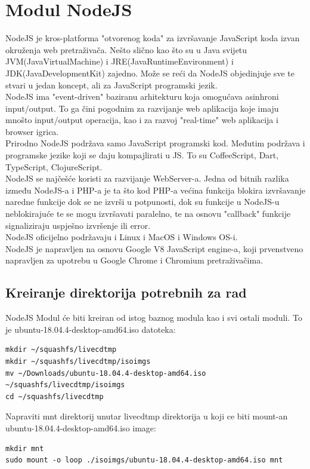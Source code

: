 \documentclass[12pt,vi]{mitthesis}
\begin{document}
\section*{Modul NodeJS}
\indent
NodeJS je kros-platforma "otvorenog koda" za izvršavanje JavaScript koda izvan okruženja web pretraživača. Nešto slično kao što su u Java svijetu JVM(JavaVirtualMachine) i JRE(JavaRuntimeEnvironment) i JDK(JavaDevelopmentKit) zajedno. Može se reći da NodeJS objedinjuje sve te stvari u jedan koncept, ali za JavaScript programski jezik.\\
NodeJS ima "event-driven" baziranu arhitekturu koja omogućava asinhroni input/output. To ga čini pogodnim za razvijanje web aplikacija koje imaju mnošto input/output operacija, kao i za razvoj "real-time" web aplikacija i browser igrica.\\
Prirodno NodeJS podržava samo JavaScript programski kod. Međutim podržava i programske jezike koji se daju kompajlirati u JS. To su CoffeeScript, Dart, TypeScript, ClojureScript.\\
NodeJS se najčešće koristi za razvijanje WebServer-a. Jedna od bitnih razlika između NodeJS-a i PHP-a je ta što kod PHP-a većina funkcija blokira izvršavanje naredne funkcije dok se ne izvrši u potpunosti, dok su funkcije u NodeJS-u neblokirajuće te se mogu izvršavati paralelno,  te na osnovu "callback" funkcije signaliziraju uspješno izvršenje ili error.\\
NodeJS oficijelno podržavaju i Linux i MacOS i Windows OS-i.\\
NodeJS je napravljen na osnovu Google V8 JavaScript engine-a, koji prvenstveno napravljen za upotrebu u Google Chrome i Chromium pretraživačima.

\subsection*{Kreiranje direktorija potrebnih za rad}
\noindent
NodeJS Modul će biti kreiran od istog baznog modula kao i svi ostali moduli. To je ubuntu-18.04.4-desktop-amd64.iso datoteka:
\begin{lstlisting}[style=BashInputStyle]
mkdir ~/squashfs/livecdtmp
mkdir ~/squashfs/livecdtmp/isoimgs
mv ~/Downloads/ubuntu-18.04.4-desktop-amd64.iso ~/squashfs/livecdtmp/isoimgs
cd ~/squashfs/livecdtmp
\end{lstlisting}

\noindent
Napraviti mnt direktorij unutar livecdtmp direktorija u koji ce biti mount-an ubuntu-18.04.4-desktop-amd64.iso image:
\begin{lstlisting}[style=BashInputStyle]
mkdir mnt
sudo mount -o loop ./isoimgs/ubuntu-18.04.4-desktop-amd64.iso mnt
\end{lstlisting}
\end{document}
